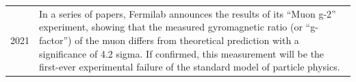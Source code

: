 \documentclass[../../main.tex]{subfiles}
\begin{document}
\begin{center}
\begin{longtable}{p{}  p{}}
2021&In a series of papers, Fermilab announces the results of its “Muon g-2” experiment, showing that the measured gyromagnetic ratio (or “g-factor”) of the muon differs from theoretical prediction with a significance of 4.2 sigma. If confirmed, this measurement will be the first-ever experimental failure of the standard model of particle physics.
    \end{longtable}
\end{center}
\end{document}
